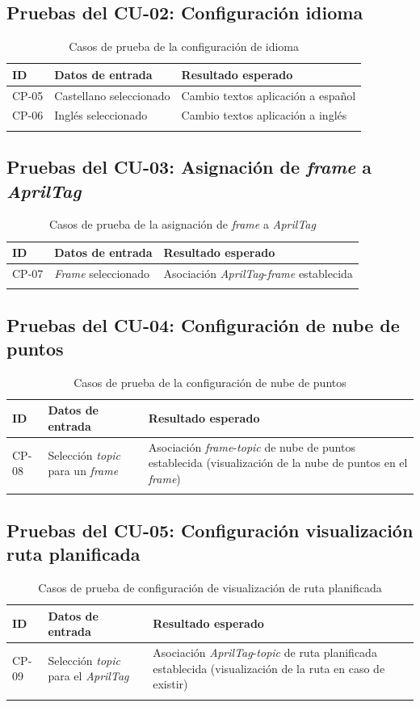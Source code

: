 \subsection{Pruebas del CU-02: Configuración idioma}
\begin{longtable}{|p{1.5cm}|p{4cm}|p{4cm}|}
\hline
\textbf{ID} & \textbf{Datos de entrada} & \textbf{Resultado esperado} \\
\hline
CP-05 & Castellano seleccionado & Cambio textos aplicación a español \\
\hline
CP-06 & Inglés seleccionado & Cambio textos aplicación a inglés \\
\hline
\caption{Casos de prueba de la configuración de idioma}
\end{longtable}

\subsection{Pruebas del CU-03: Asignación de \textit{frame} a \textit{AprilTag}}
\begin{longtable}{|p{1.5cm}|p{4cm}|p{4cm}|}
\hline
\textbf{ID} & \textbf{Datos de entrada} & \textbf{Resultado esperado} \\
\hline
CP-07 & \textit{Frame} seleccionado & Asociación \textit{AprilTag}-\textit{frame} establecida \\
\hline
\caption{Casos de prueba de la asignación de \textit{frame} a \textit{AprilTag}}
\end{longtable}

\newpage
\subsection{Pruebas del CU-04: Configuración de nube de puntos}
\begin{longtable}{|p{1.5cm}|p{4cm}|p{4cm}|}
\hline
\textbf{ID} & \textbf{Datos de entrada} & \textbf{Resultado esperado} \\
\hline
CP-08 & Selección \textit{topic} para un \textit{frame} & Asociación \textit{frame}-\textit{topic} de nube de puntos establecida (visualización de la nube de puntos en el \textit{frame})\\
\hline
\caption{Casos de prueba de la configuración de nube de puntos}
\end{longtable}

\subsection{Pruebas del CU-05: Configuración visualización ruta planificada}
\begin{longtable}{|p{1.5cm}|p{4cm}|p{4cm}|}
\hline
\textbf{ID} & \textbf{Datos de entrada} & \textbf{Resultado esperado} \\
\hline
CP-09 & Selección \textit{topic} para el \textit{AprilTag} & Asociación \textit{AprilTag}-\textit{topic} de ruta planificada establecida (visualización de la ruta en caso de existir) \\
\hline
\caption{Casos de prueba de configuración de visualización de ruta planificada}
\end{longtable}

